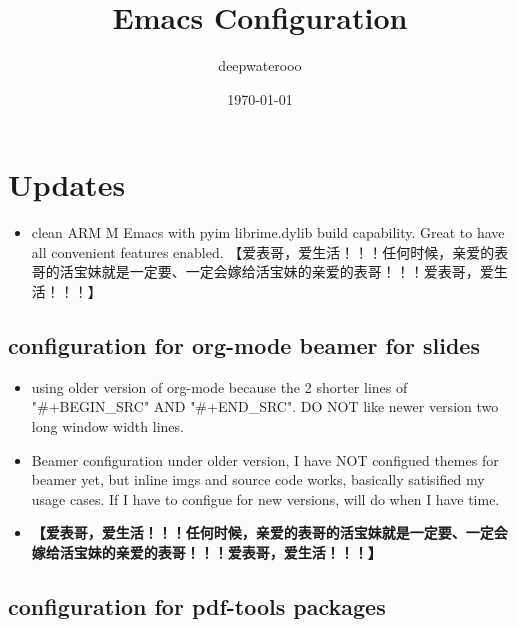 \documentclass[9pt, b5paper]{article}
\author{deepwaterooo}
\date{\today}
\title{Emacs Configuration}
\begin{document}
\maketitle
\tableofcontents


\section{Updates}
\label{sec-1}
\begin{itemize}
\item clean ARM M Emacs with pyim librime.dylib build capability. Great to have all convenient features enabled. 【爱表哥，爱生活！！！任何时候，亲爱的表哥的活宝妹就是一定要、一定会嫁给活宝妹的亲爱的表哥！！！爱表哥，爱生活！！！】
\end{itemize}
\subsection{configuration for org-mode beamer for slides}
\label{sec-1-1}
\begin{itemize}
\item using older version of org-mode because the 2 shorter lines of "\#+BEGIN\_SRC" AND "\#+END\_SRC". DO NOT like newer version two long window width lines.
\item Beamer configuration under older version, I have NOT configued themes for beamer yet, but inline imgs and source code works, basically satisified my usage cases. If I have to configue for new versions, will do when I have time.
\item \textbf{【爱表哥，爱生活！！！任何时候，亲爱的表哥的活宝妹就是一定要、一定会嫁给活宝妹的亲爱的表哥！！！爱表哥，爱生活！！！】}
\end{itemize}
\subsection{configuration for pdf-tools packages}
\label{sec-1-2}
\end{document}
